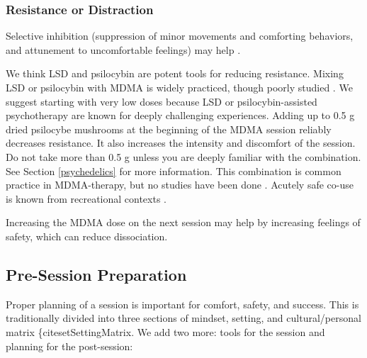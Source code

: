 \documentclass[12pt,letterpaper]{article}
\begin{document}
\subsubsection{Resistance or Distraction}
\label{selectiveInhibition}
Selective inhibition (suppression of minor movements and comforting behaviors, and attunement to uncomfortable feelings) may help \cite{razviPSIP}.

 

We think LSD and psilocybin are potent tools for reducing resistance.  Mixing LSD or psilocybin with MDMA is widely practiced, though poorly studied \cite{zeifmanCo-use}. We suggest starting with very low doses because LSD or psilocybin-assisted psychotherapy are known for deeply challenging experiences. Adding up to 0.5 g dried psilocybe mushrooms at the beginning of the MDMA session reliably decreases resistance. It also increases the intensity and discomfort of the session. Do not take more than 0.5 g unless you are deeply familiar with the combination. See Section \ref{psychedelics} for more information. This combination is common practice in MDMA-therapy, but no studies have been done \cite{colemanPsychedelicPsychotherapy}. Acutely safe co-use is known from recreational contexts \cite{zeifmanCo-use}. 

Increasing the MDMA dose on the next session may help by increasing feelings of safety, which can reduce dissociation.
\subsection{Pre-Session Preparation}
\label{prep}
Proper planning of a session is important for comfort, safety, and success. This is traditionally divided into three sections of mindset, setting, and cultural/personal matrix \{cite{setSettingMatrix}. We add two more: tools for the session and planning for the post-session:

\vspace{\baselineskip}
\end{document}
